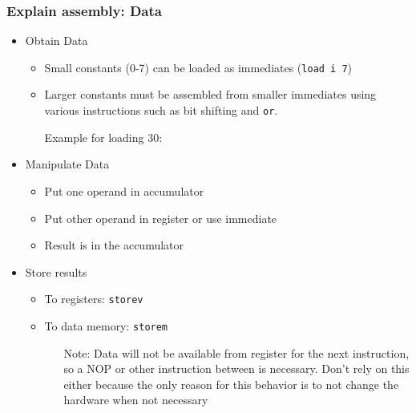 	\begin{frame}
		\frametitle{Explain assembly: Data}

		\begin{itemize}
			\item Obtain Data
				\begin{itemize}
					\item Small constants (0-7) can be loaded as immediates (\texttt{load i 7})
					\item Larger constants must be assembled from smaller immediates using various instructions such as bit shifting and \texttt{or}.

						Example for loading $30$:
						\begin{quote}
						\end{quote}
				\end{itemize}
			\item Manipulate Data
				\begin{itemize}
					\item Put one operand in accumulator
					\item Put other operand in register or use immediate
					\item Result is in the accumulator
				\end{itemize}
			\item Store results
				\begin{itemize}
					\item To registers: \texttt{storev}
					\item To data memory: \texttt{storem}
						\begin{itemize}
							\item[Note:] Data will not be available from register for the next instruction, so a NOP or other instruction between is necessary. Don't rely on this either because the only reason for this behavior is to not change the hardware when not necessary
						\end{itemize}
				\end{itemize}
		\end{itemize}
	\end{frame}

